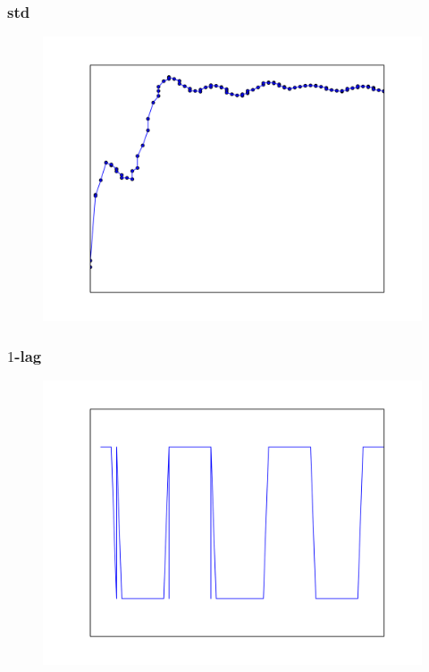 \documentclass{beamer}
\begin{document}
  \begin{frame}[plain]
    \frametitle{std}
    \begin{figure}
      \includegraphics[scale=.5]{./gfx/feature2.png}
    \end{figure}
  \end{frame}

    \begin{frame}[plain]
    \frametitle{$1$-lag}
    \begin{figure}
      \includegraphics[scale=.5]{./gfx/feature3.png}
    \end{figure}
  \end{frame}
\end{document}
